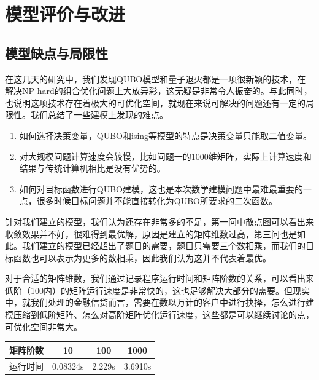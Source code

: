 \documentclass{MathorCupmodeling}
\begin{document}
	\section{模型评价与改进}
 \subsection{模型缺点与局限性}
    在这几天的研究中，我们发现QUBO模型和量子退火都是一项很新颖的技术，在解决NP-hard的组合优化问题上大放异彩，这无疑是非常令人振奋的。与此同时，也说明这项技术存在着极大的可优化空间，就现在来说可解决的问题还有一定的局限性。我们总结了一些建模上发现的难点。
    \begin{enumerate}
        \item 如何选择决策变量，QUBO和ising等模型的特点是决策变量只能取二值变量。
        \item 对大规模问题计算速度会较慢，比如问题一的1000维矩阵，实际上计算速度和结果与传统计算机相比是没有优势的。
        \item 如何对目标函数进行QUBO建模，这也是本次数学建模问题中最难最重要的一点，很多时候目标问题并不能直接转化为QUBO所要求的二次函数。
    \end{enumerate}
    针对我们建立的模型，我们认为还存在非常多的不足，第一问中散点图可以看出来收敛效果并不好，很难得到最优解，原因是建立的矩阵维数过高，第三问也是如此。我们建立的模型已经超出了题目的需要，题目只需要三个数相乘，而我们的目标函数也可以表示为更多的数相乘，因此我们认为这并不代表着最优。
    
        对于合适的矩阵维数，我们通过记录程序运行时间和矩阵阶数的关系，可以看出来低阶（100内）的矩阵运行速度是非常快的，这也足够解决大部分的需要。但现实中，就我们处理的金融信贷而言，需要在数以万计的客户中进行抉择，怎么进行建模压缩到低阶矩阵、怎么对高阶矩阵优化运行速度，这些都是可以继续讨论的点，可优化空间非常大。
    \begin{center}
 \begin{tabular}{cccc}
   \toprule
 矩阵阶数 &10 & 100 & 1000  \\
   \midrule
运行时间 & 0.08324s & 2.229s & 3.6910s \\
    \bottomrule
   \end{tabular}
   \end{center}
\end{document}

